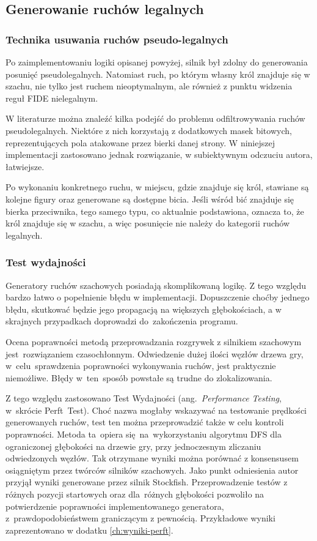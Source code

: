 \subsection{Generowanie ruchów legalnych}
\label{subsec:generowanie-ruchow-legalnych}

\subsubsection{Technika usuwania ruchów pseudo-legalnych}

Po zaimplementowaniu logiki opisanej powyżej, silnik był zdolny do generowania posunięć pseudolegalnych.
Natomiast ruch, po którym własny król znajduje się w szachu, nie tylko jest ruchem nieoptymalnym, ale również z punktu widzenia reguł FIDE nielegalnym.

W literaturze można znaleźć kilka podejść do problemu odfiltrowywania ruchów pseudolegalnych.
Niektóre z nich korzystają z dodatkowych masek bitowych, reprezentujących pola atakowane przez bierki danej strony.
W niniejszej implementacji zastosowano jednak rozwiązanie, w subiektywnym odczuciu autora, łatwiejsze.

Po wykonaniu konkretnego ruchu, w miejscu, gdzie znajduje się król, stawiane są kolejne figury oraz generowane są dostępne bicia.
Jeśli wśród bić znajduje się bierka przeciwnika, tego samego typu, co aktualnie podstawiona, oznacza to, że król znajduje się w szachu, a więc posunięcie nie należy do kategorii ruchów legalnych.

\subsubsection{Test wydajności}

Generatory ruchów szachowych posiadają skomplikowaną logikę.
Z tego względu bardzo łatwo o popełnienie błędu w implementacji.
Dopuszczenie choćby jednego błędu, skutkować będzie jego propagacją na większych głębokościach, a w skrajnych przypadkach doprowadzi do~zakończenia programu.

Ocena poprawności metodą przeprowadzania rozgrywek z silnikiem szachowym jest~rozwiązaniem czasochłonnym.
Odwiedzenie dużej ilości węzłów drzewa gry, w~celu~sprawdzenia poprawności wykonywania ruchów, jest praktycznie niemożliwe.
Błędy w~ten~sposób powstałe są trudne do zlokalizowania.

Z tego względu zastosowano Test Wydajności (ang.~\emph{Performance Testing}, w~skrócie Perft~Test).
Choć nazwa mogłaby wskazywać na testowanie prędkości generowanych ruchów, test ten można przeprowadzić także w celu kontroli poprawności.
Metoda ta~opiera się~na~wykorzystaniu algorytmu DFS dla ograniczonej głębokości na drzewie gry, przy jednoczesnym zliczaniu odwiedzonych węzłów.
Tak otrzymane wyniki można porównać z konsensusem osiągniętym przez twórców silników szachowych.
Jako punkt odniesienia autor przyjął wyniki generowane przez silnik Stockfish.
Przeprowadzenie testów z różnych pozycji startowych oraz dla~różnych głębokości pozwoliło na potwierdzenie poprawności implementowanego generatora, z~prawdopodobieństwem graniczącym z pewnością.
Przykładowe wyniki zaprezentowano w dodatku \ref{ch:wyniki-perft}.

